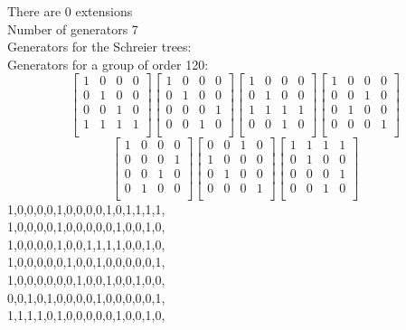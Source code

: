 There are 0 extensions\\
Number of generators 7\\
Generators for the Schreier trees:\\
{\small\arraycolsep=2pt
Generators for a group of order 120:
$$
\left[
\begin{array}{*{4}{r}}
1 & 0 & 0 & 0\\
0 & 1 & 0 & 0\\
0 & 0 & 1 & 0\\
1 & 1 & 1 & 1\\
\end{array}
\right]
\left[
\begin{array}{*{4}{r}}
1 & 0 & 0 & 0\\
0 & 1 & 0 & 0\\
0 & 0 & 0 & 1\\
0 & 0 & 1 & 0\\
\end{array}
\right]
\left[
\begin{array}{*{4}{r}}
1 & 0 & 0 & 0\\
0 & 1 & 0 & 0\\
1 & 1 & 1 & 1\\
0 & 0 & 1 & 0\\
\end{array}
\right]
\left[
\begin{array}{*{4}{r}}
1 & 0 & 0 & 0\\
0 & 0 & 1 & 0\\
0 & 1 & 0 & 0\\
0 & 0 & 0 & 1\\
\end{array}
\right]
$$
$$
\left[
\begin{array}{*{4}{r}}
1 & 0 & 0 & 0\\
0 & 0 & 0 & 1\\
0 & 0 & 1 & 0\\
0 & 1 & 0 & 0\\
\end{array}
\right]
\left[
\begin{array}{*{4}{r}}
0 & 0 & 1 & 0\\
1 & 0 & 0 & 0\\
0 & 1 & 0 & 0\\
0 & 0 & 0 & 1\\
\end{array}
\right]
\left[
\begin{array}{*{4}{r}}
1 & 1 & 1 & 1\\
0 & 1 & 0 & 0\\
0 & 0 & 0 & 1\\
0 & 0 & 1 & 0\\
\end{array}
\right]
$$
1,0,0,0,0,1,0,0,0,0,1,0,1,1,1,1,\\
1,0,0,0,0,1,0,0,0,0,0,1,0,0,1,0,\\
1,0,0,0,0,1,0,0,1,1,1,1,0,0,1,0,\\
1,0,0,0,0,0,1,0,0,1,0,0,0,0,0,1,\\
1,0,0,0,0,0,0,1,0,0,1,0,0,1,0,0,\\
0,0,1,0,1,0,0,0,0,1,0,0,0,0,0,1,\\
1,1,1,1,0,1,0,0,0,0,0,1,0,0,1,0,\\
}
